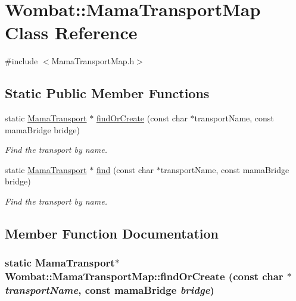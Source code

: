 \hypertarget{classWombat_1_1MamaTransportMap}{
\section{Wombat::MamaTransportMap Class Reference}
\label{classWombat_1_1MamaTransportMap}
}


{\ttfamily \#include $<$MamaTransportMap.h$>$}\subsection*{Static Public Member Functions}
\begin{DoxyCompactItemize}
\item 
static \hyperlink{classWombat_1_1MamaTransport}{MamaTransport} $\ast$ \hyperlink{classWombat_1_1MamaTransportMap_a9d39cda7fafda6bf8341f6122b1171a5}{findOrCreate} (const char $\ast$transportName, const mamaBridge bridge)
\begin{DoxyCompactList}\small\item\em Find the transport by name. \item\end{DoxyCompactList}\item 
static \hyperlink{classWombat_1_1MamaTransport}{MamaTransport} $\ast$ \hyperlink{classWombat_1_1MamaTransportMap_a02903ae89e1e885de4863342a475c573}{find} (const char $\ast$transportName, const mamaBridge bridge)
\begin{DoxyCompactList}\small\item\em Find the transport by name. \item\end{DoxyCompactList}\end{DoxyCompactItemize}


\subsection{Member Function Documentation}
\hypertarget{classWombat_1_1MamaTransportMap_a9d39cda7fafda6bf8341f6122b1171a5}{
\subsubsection[{findOrCreate}]{\setlength{\rightskip}{0pt plus 5cm}static {\bf MamaTransport}$\ast$ Wombat::MamaTransportMap::findOrCreate (const char $\ast$ {\em transportName}, \/  const mamaBridge {\em bridge})}}
\label{classWombat_1_1MamaTransportMap_a9d39cda7fafda6bf8341f6122b1171a5}


